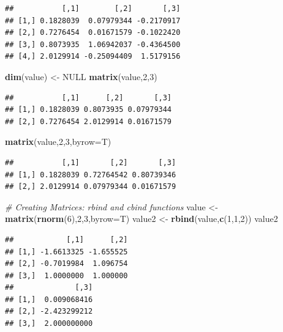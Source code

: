 \documentclass[
]{book}
\newenvironment{Shaded}{\begin{snugshade}}{\end{snugshade}}
\newcommand{\CommentTok}[1]{\textcolor[rgb]{0.56,0.35,0.01}{\textit{#1}}}
\newcommand{\DataTypeTok}[1]{\textcolor[rgb]{0.13,0.29,0.53}{#1}}
\newcommand{\DecValTok}[1]{\textcolor[rgb]{0.00,0.00,0.81}{#1}}
\newcommand{\KeywordTok}[1]{\textcolor[rgb]{0.13,0.29,0.53}{\textbf{#1}}}
\newcommand{\NormalTok}[1]{#1}
\newcommand{\OtherTok}[1]{\textcolor[rgb]{0.56,0.35,0.01}{#1}}
\newcommand{\StringTok}[1]{\textcolor[rgb]{0.31,0.60,0.02}{#1}}
\begin{document}
\begin{verbatim}
##           [,1]        [,2]       [,3]
## [1,] 0.1828039  0.07979344 -0.2170917
## [2,] 0.7276454  0.01671579 -0.1022420
## [3,] 0.8073935  1.06942037 -0.4364500
## [4,] 2.0129914 -0.25094409  1.5179156
\end{verbatim}

\begin{Shaded}
\begin{Highlighting}[]
\KeywordTok{dim}\NormalTok{(value) <-}\StringTok{ }\OtherTok{NULL}
\KeywordTok{matrix}\NormalTok{(value,}\DecValTok{2}\NormalTok{,}\DecValTok{3}\NormalTok{)}
\end{Highlighting}
\end{Shaded}

\begin{verbatim}
##           [,1]      [,2]       [,3]
## [1,] 0.1828039 0.8073935 0.07979344
## [2,] 0.7276454 2.0129914 0.01671579
\end{verbatim}

\begin{Shaded}
\begin{Highlighting}[]
\KeywordTok{matrix}\NormalTok{(value,}\DecValTok{2}\NormalTok{,}\DecValTok{3}\NormalTok{,}\DataTypeTok{byrow=}\NormalTok{T)}
\end{Highlighting}
\end{Shaded}

\begin{verbatim}
##           [,1]       [,2]       [,3]
## [1,] 0.1828039 0.72764542 0.80739346
## [2,] 2.0129914 0.07979344 0.01671579
\end{verbatim}

\begin{Shaded}
\begin{Highlighting}[]
\CommentTok{# Creating Matrices: rbind and cbind functions}
\NormalTok{value <-}\StringTok{ }\KeywordTok{matrix}\NormalTok{(}\KeywordTok{rnorm}\NormalTok{(}\DecValTok{6}\NormalTok{),}\DecValTok{2}\NormalTok{,}\DecValTok{3}\NormalTok{,}\DataTypeTok{byrow=}\NormalTok{T)}
\NormalTok{value2 <-}\StringTok{ }\KeywordTok{rbind}\NormalTok{(value,}\KeywordTok{c}\NormalTok{(}\DecValTok{1}\NormalTok{,}\DecValTok{1}\NormalTok{,}\DecValTok{2}\NormalTok{))}
\NormalTok{value2}
\end{Highlighting}
\end{Shaded}

\begin{verbatim}
##            [,1]      [,2]
## [1,] -1.6613325 -1.655525
## [2,] -0.7019984  1.096754
## [3,]  1.0000000  1.000000
##              [,3]
## [1,]  0.009068416
## [2,] -2.423299212
## [3,]  2.000000000
\end{verbatim}
\end{document}
